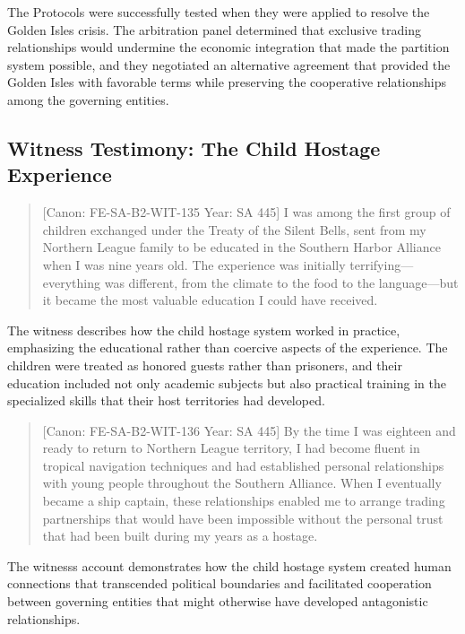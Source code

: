 The Protocols were successfully tested when they were applied to resolve
the Golden Isles crisis. The arbitration panel determined that exclusive
trading relationships would undermine the economic integration that made
the partition system possible, and they negotiated an alternative
agreement that provided the Golden Isles with favorable terms while
preserving the cooperative relationships among the governing entities.

\subsection{Witness Testimony: The Child Hostage
Experience}\label{witness-testimony-the-child-hostage-experience}

\begin{quote}
{[}Canon: FE-SA-B2-WIT-135 \textbar{} Year: SA 445{]} I was among the
first group of children exchanged under the Treaty of the Silent Bells,
sent from my Northern League family to be educated in the Southern
Harbor Alliance when I was nine years old. The experience was initially
terrifying---everything was different, from the climate to the food to
the language---but it became the most valuable education I could have
received.
\end{quote}

The witness describes how the child hostage system worked in practice,
emphasizing the educational rather than coercive aspects of the
experience. The children were treated as honored guests rather than
prisoners, and their education included not only academic subjects but
also practical training in the specialized skills that their host
territories had developed.

\begin{quote}
{[}Canon: FE-SA-B2-WIT-136 \textbar{} Year: SA 445{]} By the time I was
eighteen and ready to return to Northern League territory, I had become
fluent in tropical navigation techniques and had established personal
relationships with young people throughout the Southern Alliance. When I
eventually became a ship captain, these relationships enabled me to
arrange trading partnerships that would have been impossible without the
personal trust that had been built during my years as a hostage.
\end{quote}

The witness\textquotesingle s account demonstrates how the child hostage
system created human connections that transcended political boundaries
and facilitated cooperation between governing entities that might
otherwise have developed antagonistic relationships.

